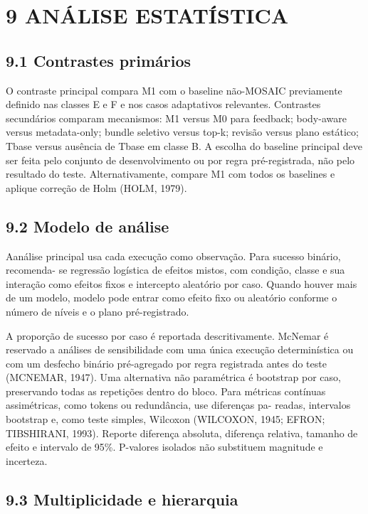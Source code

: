 \documentclass[12pt,a4paper]{article}
\begin{document}
\section*{9 ANÁLISE ESTATÍSTICA}

\subsection*{9.1 Contrastes primários}

O contraste principal compara M1 com o baseline não-MOSAIC previamente definido nas classes E e F e nos casos adaptativos relevantes. Contrastes secundários comparam mecanismos: M1 versus M0 para feedback; body-aware versus metadata-only; bundle seletivo versus top-k; revisão versus plano estático; Tbase versus ausência de Tbase em classe B. A escolha do baseline principal deve ser feita pelo conjunto de desenvolvimento ou por regra pré-registrada, não pelo resultado do teste. Alternativamente, compare M1 com todos os baselines e aplique correção de Holm (HOLM, 1979).


\subsection*{9.2 Modelo de análise}

Aanálise principal usa cada execução como observação. Para sucesso binário, recomenda- se regressão logística de efeitos mistos, com condição, classe e sua interação como efeitos fixos e intercepto aleatório por caso. Quando houver mais de um modelo, modelo pode entrar como efeito fixo ou aleatório conforme o número de níveis e o plano pré-registrado.



A proporção de sucesso por caso é reportada descritivamente. McNemar é reservado a análises de sensibilidade com uma única execução determinística ou com um desfecho binário pré-agregado por regra registrada antes do teste (MCNEMAR, 1947). Uma alternativa não paramétrica é bootstrap por caso, preservando todas as repetições dentro do bloco. Para métricas contínuas assimétricas, como tokens ou redundância, use diferenças pa- readas, intervalos bootstrap e, como teste simples, Wilcoxon (WILCOXON, 1945; EFRON; TIBSHIRANI, 1993). Reporte diferença absoluta, diferença relativa, tamanho de efeito e intervalo de 95\%. P-valores isolados não substituem magnitude e incerteza.


\subsection*{9.3 Multiplicidade e hierarquia}
\end{document}
